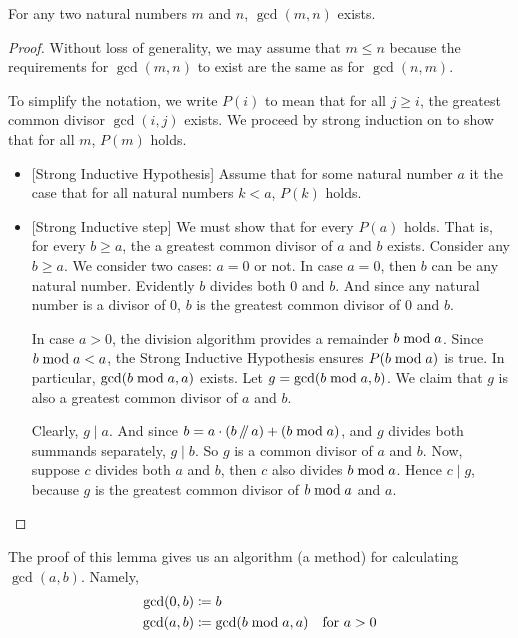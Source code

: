 \begin{thm}
 For any two natural numbers $m$ and $n$, $\gcd(m,n)$ exists.

\begin{proof}
  Without loss of generality, we may
  assume that $m\leq n$ because the requirements for $\gcd(m,n)$ to exist are the
same as for $\gcd(n,m)$.

To simplify the notation, we write $P(i)$ to mean that for all $j\geq i$, the greatest common divisor $\gcd(i,j)$ exists.
We proceed by strong induction on to show that for all $m$, $P(m)$ holds.
  \begin{itemize}
  \item{}[Strong Inductive Hypothesis] Assume that for some natural number $a$ it the case that for all natural numbers $k<a$, $P(k)$ holds.

  \item{}[Strong Inductive step] We must show that for every $P(a)$ holds. That is, for every $b\geq a$, the  
a greatest common divisor of $a$ and $b$ exists. Consider any $b\geq a$. 
   We consider two cases: $a=0$ or not.  In
    case $a=0$, then $b$ can be any natural number. Evidently $b$ divides both $0$ and $b$. And since   
    any natural number is a divisor of $0$, $b$ is the greatest common divisor of $0$ and $b$.
	
    In case $a>0$, the division algorithm provides a remainder
    $b\bmod a$.  Since $b\bmod a < a$, the Strong Inductive
    Hypothesis ensures $P(b\bmod a)$ is true. In particular, $\gcd(b\bmod a, a)$ exists.   
    Let $g=\gcd(b\bmod a,b)$.
    We claim that $g$ is also a greatest common divisor of $a$ and $b$.

    Clearly, $g\mid a$. And since $b= a\cdot (b\mathop{/\mkern-5mu/} a) + (b\bmod a)$, and $g$ divides both summands separately,  $g\mid b$. 
	So $g$ is a common divisor of $a$ and $b$. Now, suppose $c$ divides both $a$ and $b$, then $c$ also divides
	$b\bmod a$. Hence $c\mid g$, because $g$ is the greatest common divisor of $b\bmod a$ and $a$.
  \end{itemize}
\end{proof}
\end{thm}

The proof of this lemma gives us an algorithm (a method)
for calculating $\gcd(a,b)$. Namely, 
\begin{align*}
  \gcd(0,b) &\coloneqq b\\
  \gcd(a,b) &\coloneqq \gcd(b\bmod a, a) &\text{for $a > 0$}
\end{align*}

